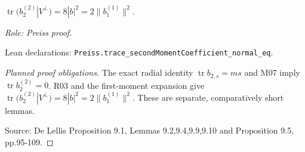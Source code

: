 \begin{lemma}
\label{lem:moment-normal-trace}






$\operatorname{tr}(b_2^{(2)}|V^\perp)=8|b|^2=2\|b_1^{(1)}\|^2$.
\par\emph{Role: Preiss proof.}
\par Lean declarations: \texttt{Preiss.trace\_secondMomentCoefficient\_normal\_eq}.
\end{lemma}
\begin{proof}[Planned proof obligations]

The exact radial identity $\operatorname{tr}b_{2,s}=ms$ and M07 imply
$\operatorname{tr}b_2^{(2)}=0$.
R03 and the first-moment expansion give
$\operatorname{tr}(b_2^{(2)}|V^\perp)=8|b|^2
=2\|b_1^{(1)}\|^2$.
These are separate, comparatively short lemmas.
\par Source: De Lellis Proposition 9.1, Lemmas 9.2,9.4,9.9,9.10 and Proposition 9.5, pp.95-109.
\end{proof}

